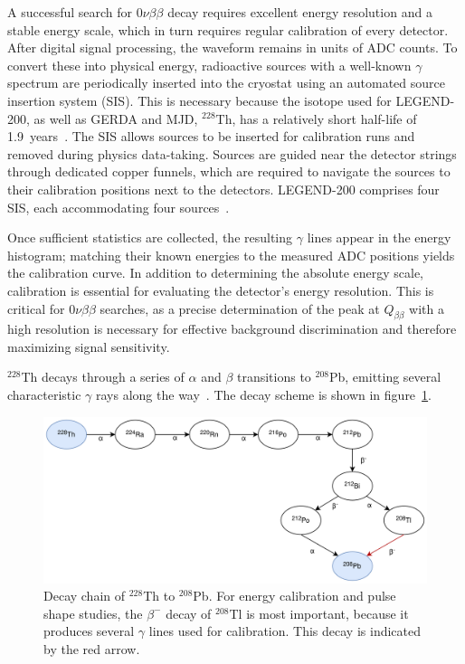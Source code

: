 A successful search for $0 \nu \beta \beta$ decay requires excellent energy resolution and a stable energy scale, which in turn requires regular calibration of every detector.
After digital signal processing, the waveform remains in units of ADC counts. To convert these into physical energy, radioactive sources with a well-known $\gamma$ spectrum are periodically inserted into the cryostat using an automated source insertion system (SIS). This is necessary because the isotope used for LEGEND-200, as well as GERDA and MJD, $^{228}$Th, has a relatively short half-life of 1.9~years~\cite{collaboration_legend-1000_2021}.
The SIS allows sources to be inserted for calibration runs and removed during physics data-taking. Sources are guided near the detector strings through dedicated copper funnels, which are required to navigate the sources to their calibration positions next to the detectors. LEGEND-200 comprises four SIS, each accommodating four sources~\cite{mueller2023}. 

Once sufficient statistics are collected, the resulting $\gamma$ lines appear in the energy histogram; matching their known energies to the measured ADC positions yields the calibration curve. 
In addition to determining the absolute energy scale, calibration is essential for evaluating the detector's energy resolution. This is critical for $0 \nu \beta \beta$ searches, as a precise determination of the peak at $Q_{\beta \beta}$ with a high resolution is necessary for effective background discrimination and therefore maximizing signal sensitivity.  

$^{228}$Th decays through a series of $\alpha$ and $\beta$ transitions to $^{208}$Pb, emitting several characteristic $\gamma$ rays along the way~\cite{baudis_calibration_2023}. The decay scheme is shown in figure~\ref{fig:Th228_decay_chain}. 

\begin{figure}
    \centering
    \includegraphics[width=\linewidth]{figures/03_legend/Th228_decay_chain.png}
    \caption{Decay chain of $^{228}$Th to $^{208}$Pb. For energy calibration and pulse shape studies, the $\beta^-$ decay of $^{208}$Tl is most important, because it produces several $\gamma$ lines used for calibration. This decay is indicated by the red arrow.}
    \label{fig:Th228_decay_chain}
\end{figure}

